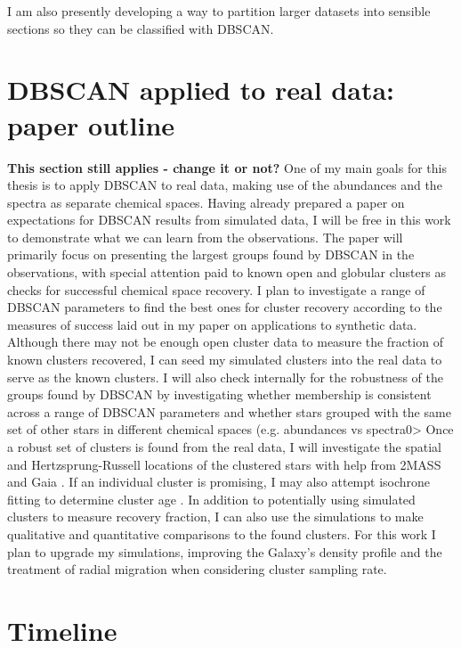 \documentclass[11pt]{article}
\begin{document}
    I am also presently developing a way to partition larger datasets into sensible sections so they can be classified with DBSCAN.
    
	
   
 
\section*{DBSCAN applied to real data: paper outline}

\textbf{This section still applies - change it or not?}
One of my main goals for this thesis is to apply DBSCAN to real data, making use of the abundances and the spectra as separate chemical spaces. Having already prepared a paper on expectations for DBSCAN results from simulated data, I will be free in this work to demonstrate what we can learn from the observations. The paper will primarily focus on presenting the largest groups found by DBSCAN in the observations, with special attention paid to known open and globular clusters as checks for successful chemical space recovery. I plan to investigate a range of DBSCAN parameters to find the best ones for cluster recovery according to the measures of success laid out in my paper on applications to synthetic data. Although there may not be enough open cluster data to measure the fraction of known clusters recovered, I can seed my simulated clusters into the real data to serve as the known clusters. I will also check internally for the robustness of the groups found by DBSCAN by investigating whether membership is consistent across a range of DBSCAN parameters and whether stars grouped with the same set of other stars in different chemical spaces (e.g. abundances vs spectra0> Once a robust set of clusters is found from the real data, I will investigate the spatial and Hertzsprung-Russell locations of the clustered stars with help from 2MASS \citep{Skrutskie2006} and Gaia \citep{GaiaCollaboration2016}. If an individual cluster is promising, I may also attempt isochrone fitting to determine cluster age \citep{Bressan2012}. In addition to potentially using simulated clusters to measure recovery fraction, I can also use the simulations to make qualitative and quantitative comparisons to the found clusters. For this work I plan to upgrade my simulations, improving the Galaxy's density profile and the treatment of radial migration when considering cluster sampling rate.


\section*{Timeline}
\end{document}
